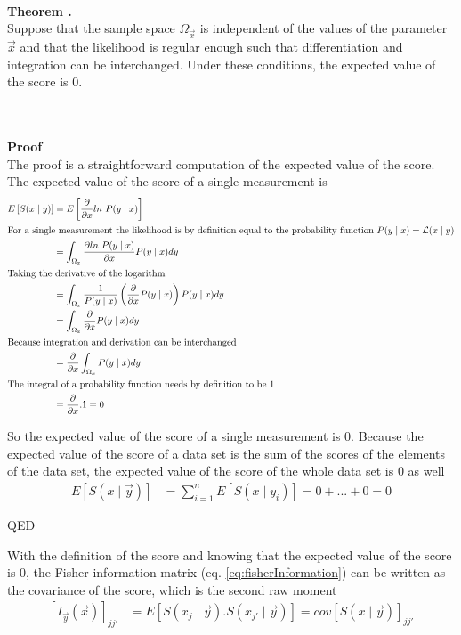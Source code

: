 \documentclass[report,12pt]{report}
\newcounter{theorem}
\newcounter{chpt}
\newcommand{\theorem}[2]
	{
		\hfill\\
		\textbf{Theorem \arabic{chpt}.\arabic{theorem}}\\
		#1
		\hfill\\
		\hfill\\
		\textbf{Proof}\\
		#2
		\begin{flushright}QED\end{flushright}
		\stepcounter{theorem}
}
\begin{document}
\theorem
{
Suppose that the sample space $\Omega_{\vec x}$ is independent of the values of the parameter $\vec x$ and that the likelihood is regular enough such that differentiation and integration can be interchanged. Under these conditions, the expected value of the score is 0.
}
{
The proof is a straightforward computation of the expected value of the score. The expected value of the score of a single measurement is
\begin{align}
	E\left[ S(x \mid y) \right] &= E\left[ \frac{\partial}
	{\partial x} ln\ P(y \mid x) \right]
	\\
	\shortintertext{For a single measurement the likelihood is by definition equal to the probability function $P(y \mid x) = \mathcal{L}(x \mid y)$}
	&= \int_{\Omega_x} \frac{\partial ln\ P(y \mid x)}
	{\partial x} P(y \mid x) dy
	\\
	\shortintertext{Taking the derivative of the logarithm}
	&= \int_{\Omega_x} \frac{1}{P(y \mid x)} \left( \frac{\partial}
	{\partial x} P(y \mid x) \right) P(y \mid x) dy
	\\
	&= \int_{\Omega_x} \frac{\partial}{\partial x} P(y \mid x) dy
	\\
	\shortintertext{Because integration and derivation can be interchanged}
	&= \frac{\partial}{\partial x} \int_{\Omega_x} P(y \mid x) dy
	\\
	\shortintertext{The integral of a probability function needs by definition to be 1}
	&= \frac{\partial}{\partial x} . 1 = 0
\end{align}

So the expected value of the score of a single measurement is 0. Because the expected value of the score of a data set is the sum of the scores of the elements of the data set, the expected value of the score of the whole data set is 0 as well
\begin{align}
	E\left[ S(x \mid \vec y) \right] &= 
	\sum_{i=1}^{n}E\left[ S(x \mid y_i ) \right] = 0 + ... + 0 = 0
\end{align}
}\hfill

With the definition of the score and knowing that the expected value of the score is 0, the Fisher information matrix (eq. \ref{eq:fisherInformation}) can be written as the covariance of the score, which is the second raw moment
\begin{align}
	\left[ I_{\vec y}(\vec x) \right]_{jj'} 
	&= E\left[ S(x_j \mid \vec y).S(x_{j'} \mid \vec y) 
	\right]
	= cov[S(x \mid \vec y )]_{jj'} 
\end{align}
\end{document}
